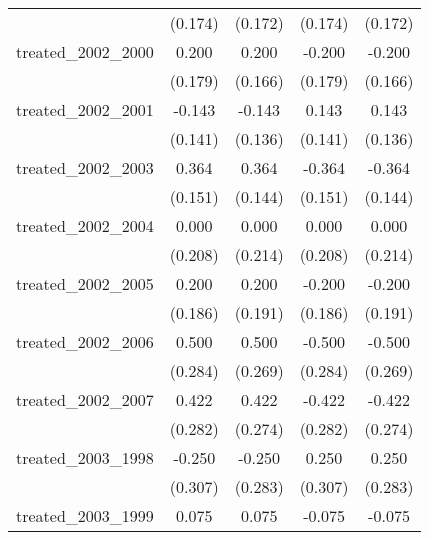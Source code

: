 {\begin{tabular}{l*{4}{c}}
            &     (0.174)         &     (0.172)         &     (0.174)         &     (0.172)         \\
[1em]
treated\_2002\_2000&       0.200         &       0.200         &      -0.200         &      -0.200         \\
            &     (0.179)         &     (0.166)         &     (0.179)         &     (0.166)         \\
[1em]
treated\_2002\_2001&      -0.143         &      -0.143         &       0.143         &       0.143         \\
            &     (0.141)         &     (0.136)         &     (0.141)         &     (0.136)         \\
[1em]
treated\_2002\_2003&       0.364\sym{*}  &       0.364\sym{*}  &      -0.364\sym{*}  &      -0.364\sym{*}  \\
            &     (0.151)         &     (0.144)         &     (0.151)         &     (0.144)         \\
[1em]
treated\_2002\_2004&       0.000         &       0.000         &       0.000         &       0.000         \\
            &     (0.208)         &     (0.214)         &     (0.208)         &     (0.214)         \\
[1em]
treated\_2002\_2005&       0.200         &       0.200         &      -0.200         &      -0.200         \\
            &     (0.186)         &     (0.191)         &     (0.186)         &     (0.191)         \\
[1em]
treated\_2002\_2006&       0.500         &       0.500         &      -0.500         &      -0.500         \\
            &     (0.284)         &     (0.269)         &     (0.284)         &     (0.269)         \\
[1em]
treated\_2002\_2007&       0.422         &       0.422         &      -0.422         &      -0.422         \\
            &     (0.282)         &     (0.274)         &     (0.282)         &     (0.274)         \\
[1em]
treated\_2003\_1998&      -0.250         &      -0.250         &       0.250         &       0.250         \\
            &     (0.307)         &     (0.283)         &     (0.307)         &     (0.283)         \\
[1em]
treated\_2003\_1999&       0.075         &       0.075         &      -0.075         &      -0.075         \\

\end{tabular}}
